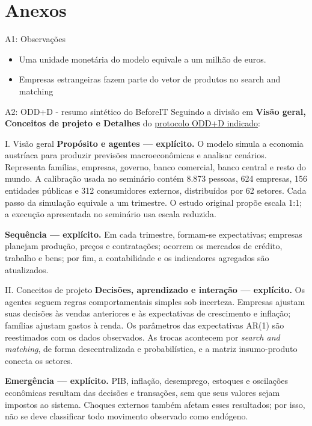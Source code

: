 \documentclass[aspectratio=169,11pt]{beamer}
\begin{document}
\section{Anexos}

\begin{frame}[allowframebreaks]{A1: Observações}
\normalsize
\begin{itemize}
\item
  Uma unidade monetária do modelo equivale a um milhão de euros.
\item
  Empresas estrangeiras fazem parte do vetor de produtos no search and matching
\end{itemize}
\end{frame}


\begin{frame}[allowframebreaks]{A2: ODD+D - resumo sintético do BeforeIT}
\normalsize
Seguindo a divisão em \textbf{Visão geral, Conceitos de projeto e Detalhes} do \href{https://github.com/danielbandrade/odd-d-abm-extractor/blob/main/references/odd-d-protocol.md}{protocolo ODD+D indicado}:
\end{frame}


\begin{frame}[allowframebreaks]{I. Visão geral}
\normalsize
\textbf{Propósito e agentes --- explícito.} O modelo simula a economia austríaca para produzir previsões macroeconômicas e analisar cenários. Representa famílias, empresas, governo, banco comercial, banco central e resto do mundo. A calibração usada no seminário contém 8.873 pessoas, 624 empresas, 156 entidades públicas e 312 consumidores externos, distribuídos por 62 setores. Cada passo da simulação equivale a um trimestre. O estudo original propõe escala 1:1; a execução apresentada no seminário usa escala reduzida.

\textbf{Sequência --- explícito.} Em cada trimestre, formam-se expectativas; empresas planejam produção, preços e contratações; ocorrem os mercados de crédito, trabalho e bens; por fim, a contabilidade e os indicadores agregados são atualizados.
\end{frame}


\begin{frame}[allowframebreaks]{II. Conceitos de projeto}
\normalsize
\textbf{Decisões, aprendizado e interação --- explícito.} Os agentes seguem regras comportamentais simples sob incerteza. Empresas ajustam suas decisões às vendas anteriores e às expectativas de crescimento e inflação; famílias ajustam gastos à renda. Os parâmetros das expectativas AR(1) são reestimados com os dados observados. As trocas acontecem por \emph{search and matching}, de forma descentralizada e probabilística, e a matriz insumo-produto conecta os setores.

\textbf{Emergência --- explícito.} PIB, inflação, desemprego, estoques e oscilações econômicas resultam das decisões e transações, sem que seus valores sejam impostos ao sistema. Choques externos também afetam esses resultados; por isso, não se deve classificar todo movimento observado como endógeno.
\end{frame}
\end{document}
